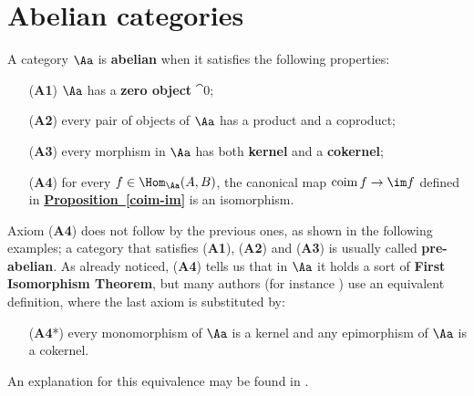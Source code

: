 
\section{Abelian categories}

\begin{df!}\label{df-abel}
    A category $\Aa$ is \textbf{abelian}
    when it satisfies the following properties:
    \begin{itemize}
        \item[(\textbf{A1})] $\Aa$ has a \textbf{zero object} $\cat{0}$;
        \item[(\textbf{A2})] every pair of objects of $\Aa$ has a product and a coproduct;
        \item[(\textbf{A3})] every morphism in $\Aa$ has both \textbf{kernel} and a \textbf{cokernel};
        \item[(\textbf{A4})] for every $f \in \Hom_{\Aa}(A,B)$,
        the canonical map $\operatorname{coim}f \to \im f$
        defined in \hyperref[coim-im]{\textbf{Proposition~\ref*{coim-im}}}
        is an isomorphism.
    \end{itemize}
\end{df!}

\begin{rmk}
    Axiom (\textbf{A4}) does not follow by the previous ones,
    as shown in the following examples;
    a category that satisfies (\textbf{A1}), (\textbf{A2}) and (\textbf{A3}) is usually called \textbf{pre-abelian}.
    As already noticed, (\textbf{A4}) tells us
    that in $\Aa$ it holds a sort of \textbf{First Isomorphism Theorem},
    but many authors (for instance \parencite[]{borceux})
    use an equivalent definition, where the last axiom 
    is substituted by:
    \begin{itemize}
         \item[(\textbf{A4}*)] every monomorphism of $\Aa$ is a kernel
        and any epimorphism of $\Aa$ is a cokernel.
    \end{itemize}
    An explanation for this equivalence may be found in \parencite[]{ab-eq-def}.
\end{rmk}

